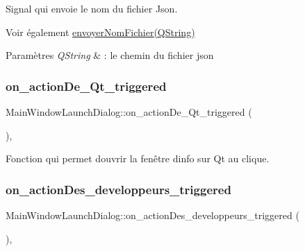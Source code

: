 Signal qui envoie le nom du fichier Json. 

\begin{DoxySeeAlso}{Voir également}
\hyperlink{classMainWindowLaunchDialog_ab439c55ab98e6b1634de4fe64243ce48}{envoyer\+Nom\+Fichier(\+Q\+String)} 
\end{DoxySeeAlso}

\begin{DoxyParams}{Paramètres}
{\em Q\+String} & \+: le chemin du fichier json \\
\hline
\end{DoxyParams}
\mbox{\label{classMainWindowLaunchDialog_a91bfa59302a3591b7b3b11b03d6f9b0e}} 
\subsubsection{\texorpdfstring{on\+\_\+action\+De\+\_\+\+Qt\+\_\+triggered}{on\_actionDe\_Qt\_triggered}}
{\footnotesize\ttfamily Main\+Window\+Launch\+Dialog\+::on\+\_\+action\+De\+\_\+\+Qt\+\_\+triggered (\begin{DoxyParamCaption}{ }\end{DoxyParamCaption})\hspace{0.3cm}{\ttfamily [private]}, {\ttfamily [slot]}}



Fonction qui permet d\textquotesingle{}ouvrir la fenêtre d\textquotesingle{}info sur Qt au clique. 

\mbox{\label{classMainWindowLaunchDialog_aaa766b56e4327b3bedf7f88c1b52cee7}} 
\subsubsection{\texorpdfstring{on\+\_\+action\+Des\+\_\+developpeurs\+\_\+triggered}{on\_actionDes\_developpeurs\_triggered}}
{\footnotesize\ttfamily Main\+Window\+Launch\+Dialog\+::on\+\_\+action\+Des\+\_\+developpeurs\+\_\+triggered (\begin{DoxyParamCaption}{ }\end{DoxyParamCaption})\hspace{0.3cm}{\ttfamily [private]}, {\ttfamily [slot]}}



